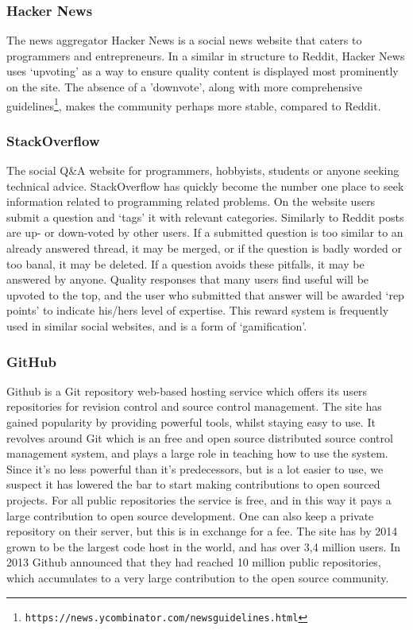 \documentclass[a4paper,11pt]{article} %
\begin{document}
\subsubsection*{Hacker News}
The news aggregator Hacker News is a social news website that caters to
programmers and entrepreneurs. In a similar in structure to Reddit, Hacker
News uses ‘upvoting’ as a way to ensure quality content is displayed most
prominently on the site. The absence of a 'downvote', along with more
comprehensive guidelines\footnote{\texttt{https://news.ycombinator.com/newsguidelines.html}},
makes the community perhaps more stable, compared to Reddit.


\subsubsection*{StackOverflow}

The social Q\&A website for programmers, hobbyists, students or anyone
seeking technical advice. StackOverflow has quickly become the number one
place to seek information related to programming related problems. On the
website users submit a question and ‘tags’ it with relevant categories.
Similarly to Reddit posts are up- or down-voted by other users. If a
submitted question is too similar to an already answered thread, it may be
merged, or if the question is badly worded or too banal, it may be
deleted. If a question avoids these pitfalls, it may be answered by
anyone. Quality responses that many users find useful will be upvoted to the
top, and the user who submitted that answer will be awarded ‘rep points’ to
indicate his/hers level of expertise. This reward system is frequently used
in similar social websites, and is a form of ‘gamification’.

\subsubsection*{GitHub}

Github is a Git repository web-based hosting service which offers its users
repositories for revision control and source control management. The site
has gained popularity by providing powerful tools, whilst staying easy to
use. It revolves around Git which is an free and open source distributed
source control management system, and plays a large role in teaching how to
use the system. Since it’s no less powerful than it’s predecessors, but is a
lot easier to use, we suspect it has lowered the bar to start making
contributions to open sourced projects. For all public repositories the
service is free, and in this way it pays a large contribution to open source
development. One can also keep a private repository on their server, but
this is in exchange for a fee. The site has by 2014 grown to be the largest
code host in the world, and has over 3,4 million users. In 2013 Github
announced that they had reached 10 million public repositories, which
accumulates to a very large contribution to the open source community.
\end{document}
